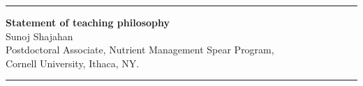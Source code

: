 \documentclass[11pt]{article}
\begin{document}

\begin{center}
\hrule
{\Large\textbf{Statement of teaching philosophy}}\\
\vspace{0.5em}
\normalsize{Sunoj Shajahan\\
Postdoctoral Associate, Nutrient Management Spear Program,\\
Cornell University, Ithaca, NY.}
\vspace{0.5em}
\hrule
\end{center}
\vspace{0.5em}

\begin{center}
\end{center}
\end{document}
